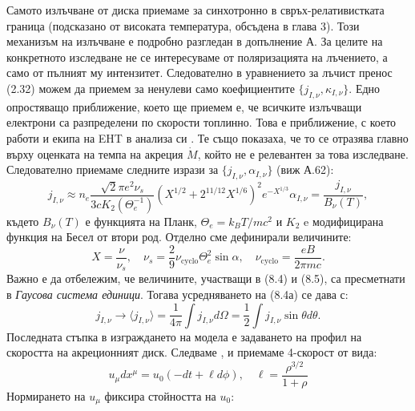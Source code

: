Самото излъчване от диска приемаме за синхотронно в свръх-релативистката граница (подсказано от високата температура, обсъдена в глава 3). Този механизъм на излъчване е подробно разгледан в допълнение А. За целите на конкретното изследване не се интересуваме от поляризацията на лъчението, а само от пълният му интензитет. Следователно в уравнението за лъчист пренос (2.32) можем да приемем за ненулеви само коефициентите $\{j_{I,\nu}, \kappa_{I,\nu}\}.$ Едно опростяващо приближение, което ще приемем е, че всичките излъчващи електрони са разпределени по скорости топлинно. Това е приближение, с което работи и екипа на EHT в анализа си \cite{EHT_M87_VIII}. Те също показаха, че то се отразява главно върху оценката на темпа на акреция $\dot{M}$, който не е релевантен за това изследване. Следователно приемаме следните изрази за $\{j_{I,\nu}, \alpha_{I,\nu}\}$ (виж А.62):
\begin{subequations}
	\begin{equation}
		j_{I,\nu}\approx n_e \frac{\sqrt{2}\pi e^2\nu_s}{3cK_2(\Theta_e^{-1})}\left(X^{1/2} + 2^{11/12}X^{1/6}\right)^2 e^{-X^{1/3}}
	\end{equation}
	\begin{equation}
		\alpha_{I,\nu} = \frac{j_{I,\nu}}{B_\nu(T)},
	\end{equation}
\end{subequations}
където $B_\nu(T)$ е функцията на Планк, $\Theta_e = k_BT/mc^2$ и $K_2$ e модифицирана функция на Бесел от втори род. Отделно сме дефинирали величините:
\begin{equation}
	X = \frac{\nu}{\nu_s},\quad \nu_s = \frac{2}{9}\nu_\text{cyclo}\Theta_e^2\sin\alpha, \quad \nu_\text{cyclo} = \frac{eB}{2\pi m c}.
\end{equation}
Важно е да отбележим, че величините, участващи в (8.4) и (8.5), са пресметнати в \emph{Гаусова система единици}. Тогава усредняването на (8.4а) се дава с:
\begin{equation}
	j_{I,\nu}\rightarrow\langle j_{I,\nu} \rangle = \frac{1}{4\pi}\int j_{I,\nu} d\Omega = \frac{1}{2}\int j_{I,\nu} \sin\theta d\theta.
\end{equation}
Последната стъпка в изграждането на модела е задаването на профил на скоростта на акреционният диск. Следваме \cite{Broderick2021}, \cite{Gold2020} и приемаме 4-скорост от вида:
\begin{equation}
	u_\mu dx^\mu = u_0(-dt + \ell d\phi),\quad \ell = \frac{\rho^{3/2}}{1 +\rho}
\end{equation}
Нормирането на $u_\mu$ фиксира стойността на $u_0$:
